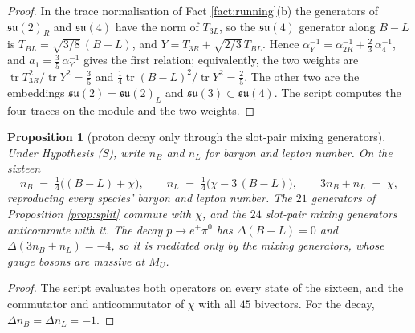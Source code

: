 \documentclass[11pt]{article}
\newtheorem{proposition}[theorem]{Proposition}
\theoremstyle{definition}
\newcommand{\tr}{\operatorname{tr}}
\newcommand{\su}{\mathfrak{su}}
\begin{document}
\begin{proof}
In the trace normalisation of Fact \ref{fact:running}(b) the generators of $\su(2)_{R}$ and $\su(4)$ have the norm of $T_{3L}$, so the $\su(4)$ generator along $B - L$ is $T_{BL} = \sqrt{3/8}\,(B - L)$, and $Y = T_{3R} + \sqrt{2/3}\,T_{BL}$. Hence $\alpha_{Y}^{-1} = \alpha_{2R}^{-1} + \tfrac23\,\alpha_{4}^{-1}$, and $a_{1} = \tfrac35\,\alpha_{Y}^{-1}$ gives the first relation; equivalently, the two weights are $\tr T_{3R}^{2}/\tr Y^{2} = \tfrac35$ and $\tfrac14\tr(B - L)^{2}/\tr Y^{2} = \tfrac25$. The other two are the embeddings $\su(2) = \su(2)_{L}$ and $\su(3) \subset \su(4)$. The script computes the four traces on the module and the two weights.
\end{proof}

\begin{proposition}[proton decay only through the slot-pair mixing generators]\label{prop:protonchannel}
Under Hypothesis (S), write $n_{B}$ and $n_{L}$ for baryon and lepton number. On the sixteen
\[
n_{B} \;=\; \tfrac14\bigl((B - L) + \chi\bigr), \qquad n_{L} \;=\; \tfrac14\bigl(\chi - 3\,(B - L)\bigr), \qquad 3n_{B} + n_{L} \;=\; \chi,
\]
reproducing every species' baryon and lepton number. The $21$ generators of Proposition \ref{prop:split} commute with $\chi$, and the $24$ slot-pair mixing generators anticommute with it. The decay $p \to e^{+}\pi^{0}$ has $\Delta(B - L) = 0$ and $\Delta(3n_{B} + n_{L}) = -4$, so it is mediated only by the mixing generators, whose gauge bosons are massive at $M_{U}$.
\end{proposition}

\begin{proof}
The script evaluates both operators on every state of the sixteen, and the commutator and anticommutator of $\chi$ with all $45$ bivectors. For the decay, $\Delta n_{B} = \Delta n_{L} = -1$.
\end{proof}
\end{document}
